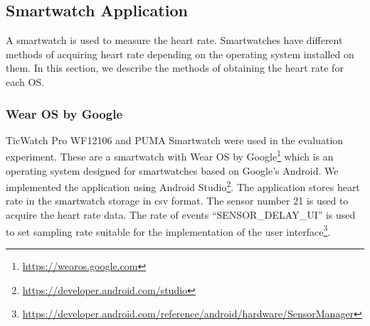 \documentclass[sigchi,authordraft]{acmart}
\newcommand\figref[1]{\textbf{Figure~\ref{fig:#1}}}
\newcommand\tabref[1]{\textbf{Table~\ref{tab:#1}}}
\begin{document}
\subsection{Smartwatch Application}
\label{subsec:wearos}
A smartwatch is used to measure the heart rate. Smartwatches have different methods of acquiring heart rate depending on the operating system installed on them. In this section, we describe the methods of obtaining the heart rate for each OS.


\subsubsection{Wear OS by Google}
TicWatch Pro WF12106 and PUMA Smartwatch were used in the evaluation experiment. These are a smartwatch with Wear OS by Google\footnote{\url{https://wearos.google.com}} which is an operating system designed for smartwatches based on Google's Android. We implemented the application using Android Studio\footnote{\url{https://developer.android.com/studio}}. The application stores heart rate in the smartwatch storage in csv format.
The sensor number 21 is used to acquire the heart rate data. The rate of events ``SENSOR\_DELAY\_UI'' is used to set sampling rate suitable for the implementation of the user interface\footnote{\url{https://developer.android.com/reference/android/hardware/SensorManager}}.
\end{document}
